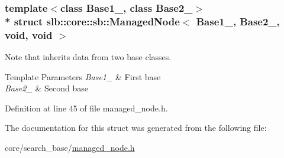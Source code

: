 \subsubsection*{template$<$class Base1\+\_\+, class Base2\+\_\+$>$\\*
struct slb\+::core\+::sb\+::\+Managed\+Node$<$ Base1\+\_\+, Base2\+\_\+, void, void $>$}

Note that inherits data from two base classes. 


\begin{DoxyTemplParams}{Template Parameters}
{\em Base1\+\_\+} & First base \\
\hline
{\em Base2\+\_\+} & Second base \\
\hline
\end{DoxyTemplParams}


Definition at line 45 of file managed\+\_\+node.\+h.



The documentation for this struct was generated from the following file\+:\begin{DoxyCompactItemize}
\item 
core/search\+\_\+base/\hyperlink{managed__node_8h}{managed\+\_\+node.\+h}\end{DoxyCompactItemize}
